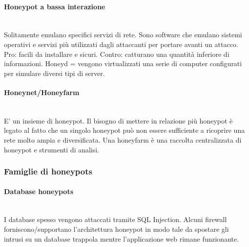 \documentclass[8pt]{extarticle}
\begin{document}
\paragraph{Honeypot a bassa interazione}
\noindent
\\
Solitamente emulano specifici servizi di rete. Sono software che emulano sistemi operativi e servizi più utilizzati 
dagli attaccanti per portare avanti un attacco. Pro: facili da installare e sicuri. Contro: catturano una quantità 
inferiore di informazioni. Honeyd = vengono virtualizzati una serie di computer configurati per simulare diversi 
tipi di server.
\paragraph{Honeynet/Honeyfarm}
\noindent
\\
E’ un insieme di honeypot. Il bisogno di mettere in relazione più honeypot è legato al fatto che un singolo honeypot può non 
essere sufficiente a ricoprire una rete molto ampia e diversificata. Una honeyfarm è una raccolta centralizzata di honeypot 
e strumenti di analisi.
\subsubsection{Famiglie di honeypots}
\paragraph{Database honeypots}
\noindent
\\
I database spesso vengono attaccati tramite SQL Injection. Alcuni firewall forniscono/supportano l’architettura honeypot in 
modo tale da spostare gli intrusi su un database trappola mentre l’applicazione web rimane funzionante.
\end{document}
